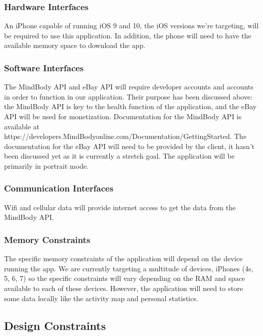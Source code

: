 \documentclass[letterpaper,10pt,titlepage]{article}
\begin{document}
\subsubsection{Hardware Interfaces}

An iPhone capable of running iOS 9 and 10, the iOS versions we’re targeting, will be required to use this application. In addition, the phone will need to have the available memory space to download the app.

\subsubsection{Software Interfaces}

The MindBody API and eBay API will require developer accounts and accounts in order to function in our application. Their purpose has been discussed above: the MindBody API is key to the health function of the application, and the eBay API will be used for monetization. Documentation for the MindBody API is available at https://developers.MindBodyonline.com/Documentation/GettingStarted. The documentation for the eBay API will need to be provided by the client, it hasn’t been discussed yet as it is currently a stretch goal. The application will be primarily in portrait mode.

\subsubsection{Communication Interfaces}

Wifi and cellular data will provide internet access to get the data from the MindBody API.

\subsubsection{Memory Constraints}

The specific memory constraints of the application will depend on the device running the app. We are currently targeting a multitude of devices, iPhones (4s, 5, 6, 7) so the specific constraints will vary depending on the RAM and space available to each of these devices. However, the application will need to store some data locally like the activity map and personal statistics.

\subsection{Design Constraints}
\end{document}
